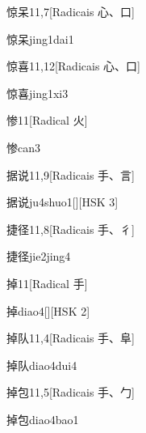 \begin{entry}{惊呆}{11,7}[Radicais ⼼、⼝]
  \begin{phonetics}{惊呆}{jing1dai1}
  \end{phonetics}
\end{entry}

\begin{entry}{惊喜}{11,12}[Radicais ⼼、⼝]
  \begin{phonetics}{惊喜}{jing1xi3}
  \end{phonetics}
\end{entry}

\begin{entry}{惨}{11}[Radical ⽕]
  \begin{phonetics}{惨}{can3}
  \end{phonetics}
\end{entry}

\begin{entry}{据说}{11,9}[Radicais ⼿、⾔]
  \begin{phonetics}{据说}{ju4shuo1}[][HSK 3]
  \end{phonetics}
\end{entry}

\begin{entry}{捷径}{11,8}[Radicais ⼿、⼻]
  \begin{phonetics}{捷径}{jie2jing4}
  \end{phonetics}
\end{entry}

\begin{entry}{掉}{11}[Radical ⼿]
  \begin{phonetics}{掉}{diao4}[][HSK 2]
  \end{phonetics}
\end{entry}

\begin{entry}{掉队}{11,4}[Radicais ⼿、⾩]
  \begin{phonetics}{掉队}{diao4dui4}
  \end{phonetics}
\end{entry}

\begin{entry}{掉包}{11,5}[Radicais ⼿、⼓]
  \begin{phonetics}{掉包}{diao4bao1}
  \end{phonetics}
\end{entry}

